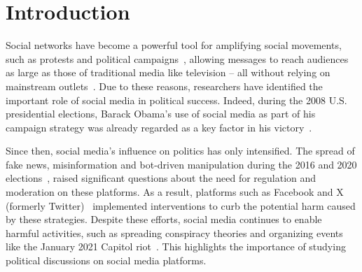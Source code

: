 \section{Introduction}
\label{sec:introduction}

Social networks have become a powerful tool for amplifying social movements, such as protests \cite{wolfsfeld2013social} and political campaigns~\cite{groshek2017helping}, allowing messages to reach audiences as large as those of traditional media like television -- all without relying on mainstream outlets~\cite{boynton2016agenda}.   %
Due to these reasons, researchers have identified the important role of social media in political success. Indeed, during the 2008 U.S. presidential elections,  Barack Obama's use of social media as part of his campaign strategy was already regarded as a key factor in his victory~\cite{hughes2010obama}.

Since then, social media's influence on politics has only intensified. The spread of fake news, misinformation and bot-driven manipulation during the 2016 and 2020 elections~\cite{gunther2019fake,ferrara2020characterizing}, raised significant questions about the need for regulation and moderation on these platforms. As a result, platforms such as Facebook and X (formerly Twitter)~\cite{zannettou2021won} implemented interventions to curb the potential harm caused by these strategies. Despite these efforts, social media continues to enable harmful activities, such as spreading  conspiracy theories and organizing events like the January 2021 Capitol riot~\cite{o2023coming}. This highlights the importance of studying political discussions on social media platforms. 



